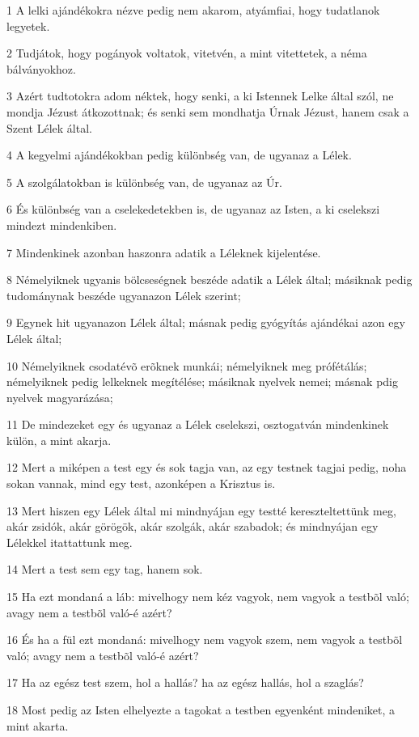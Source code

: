 \par 1 A lelki ajándékokra nézve pedig nem akarom, atyámfiai, hogy tudatlanok legyetek.
\par 2 Tudjátok, hogy pogányok voltatok, vitetvén, a mint vitettetek, a néma bálványokhoz.
\par 3 Azért tudtotokra adom néktek, hogy senki, a ki Istennek Lelke által szól, ne mondja Jézust átkozottnak; és  senki sem mondhatja Úrnak Jézust, hanem csak a Szent Lélek által.
\par 4 A kegyelmi ajándékokban pedig különbség van, de ugyanaz a Lélek.
\par 5 A szolgálatokban is különbség van, de ugyanaz az Úr.
\par 6 És különbség van a cselekedetekben is, de ugyanaz az Isten, a ki cselekszi mindezt mindenkiben.
\par 7 Mindenkinek azonban haszonra adatik a Léleknek kijelentése.
\par 8 Némelyiknek ugyanis bölcseségnek beszéde adatik a Lélek által; másiknak pedig tudománynak  beszéde ugyanazon Lélek szerint;
\par 9 Egynek hit ugyanazon Lélek által; másnak pedig gyógyítás ajándékai azon egy Lélek által;
\par 10 Némelyiknek csodatévõ erõknek munkái; némelyiknek meg prófétálás; némelyiknek pedig lelkeknek megítélése;  másiknak nyelvek nemei; másnak pdig nyelvek magyarázása;
\par 11 De mindezeket egy és ugyanaz a Lélek cselekszi, osztogatván mindenkinek külön, a mint akarja.
\par 12 Mert a miképen a test egy és sok tagja van, az egy testnek tagjai pedig, noha sokan vannak, mind  egy test, azonképen a Krisztus is.
\par 13 Mert hiszen egy Lélek által mi mindnyájan egy testté kereszteltettünk meg, akár zsidók, akár görögök, akár szolgák, akár szabadok; és mindnyájan egy Lélekkel itattattunk meg.
\par 14 Mert a test sem egy tag, hanem sok.
\par 15 Ha ezt mondaná a láb: mivelhogy nem kéz vagyok, nem vagyok a testbõl való; avagy nem a testbõl való-é azért?
\par 16 És ha a fül ezt mondaná: mivelhogy nem vagyok szem, nem vagyok a testbõl való; avagy nem a testbõl való-é azért?
\par 17 Ha az egész test szem, hol a hallás? ha az egész hallás, hol a szaglás?
\par 18 Most pedig az Isten elhelyezte a tagokat a testben egyenként mindeniket, a mint akarta.
